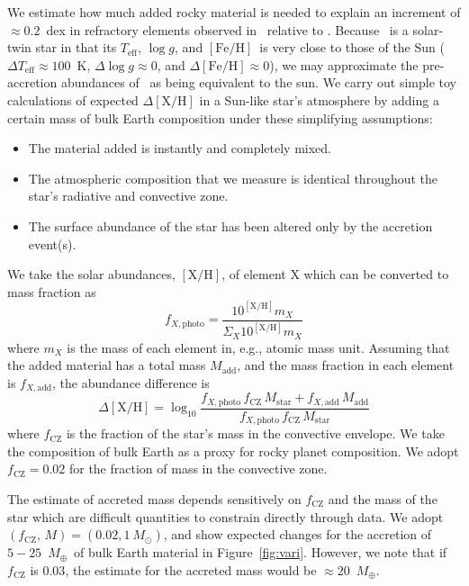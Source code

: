 \documentclass[12pt,letterpaper,margin=1in]{article}
\newcommand{\figname}{Figure}
\newcommand*\elem[1]{\ensuremath{\mathrm{#1}}}
\newcommand*\elemH[1]{\ensuremath{[\mathrm{#1}/\elem{H}]}}
\newcommand*\logg{\ensuremath{\log{g}}}
\newcommand*{\feh}{\ensuremath{\elemH{Fe}}}
\newcommand{\sunanalog}{\text{Krios}}
\newcommand{\bizarreone}{\text{Kronos}}
\newcommand{\mearth}{\ensuremath{M_\oplus}}
\begin{document}
We estimate how much added rocky material is needed to explain an
increment of $\approx 0.2$~dex in refractory elements observed in \bizarreone\
relative to \sunanalog\cite{Mack:2014aa,Mack:2016aa}.
Because \sunanalog\ is a solar-twin star in that its $T_\mathrm{eff}$, \logg,
and \feh\ is very close to those of the Sun ($\Delta T_\mathrm{eff} \approx 100$~K,
$\Delta\logg \approx 0$, and $\Delta\feh \approx 0$),
we may approximate the pre-accretion abundances of \bizarreone\ as being
equivalent to the sun.
We carry out simple toy calculations of expected $\Delta\elemH{X}$
in a Sun-like star's atmosphere by adding a certain mass of bulk Earth
composition under these simplifying assumptions:
\begin{itemize}
  \item The material added is instantly and completely mixed.
  \item The atmospheric composition that we measure is identical throughout
    the star's radiative and convective zone.
  \item The surface abundance of the star has been altered only by the
    accretion event(s).
\end{itemize}
We take the solar abundances\cite{Asplund:2009aa}, $\elemH{X}$, of element \elem{X}
which can be converted to mass fraction as
\begin{equation}
  f_{X,\mathrm{photo}} = \frac{10^{\elemH{X}} m_X}{\Sigma_X 10^{\elemH{X}} m_X}
\end{equation}
where $m_X$ is the mass of each element in, e.g., atomic mass unit.
Assuming that the added material has a total mass $M_\mathrm{add}$, and the
mass fraction in each element is $f_{X,\mathrm{add}}$,
the abundance difference is
\begin{equation}
  \Delta\elemH{X} = \log_{10} \frac{f_{X,\mathrm{photo}}\,f_\mathrm{CZ}\,M_\mathrm{star}
    + f_{X,\mathrm{add}}\,M_\mathrm{add}}
    {f_{X,\mathrm{photo}}\,f_\mathrm{CZ}\,M_\mathrm{star}}
\end{equation}
where $f_\mathrm{CZ}$ is the fraction of the star's mass in the convective envelope.
We take the composition of bulk Earth\cite{mcdonough2001composition}
as a proxy for rocky planet composition. We adopt $f_\mathrm{CZ} = 0.02$ for
the fraction of mass in the convective zone\cite{Pinsonneault:2001aa}.

The estimate of accreted mass depends sensitively on $f_\mathrm{CZ}$ and the
mass of the star which are difficult quantities to constrain directly through
data.
We adopt $(f_\mathrm{CZ},\,M) = (0.02, 1~M_\odot)$, and show
expected changes for the accretion of $5-25$~\mearth\ of bulk Earth material
in \figname~\ref{fig:vari}.
However, we note that if $f_\mathrm{CZ}$ is $0.03$, the estimate for the accreted
mass would be $\approx 20$~\mearth.
\end{document}
